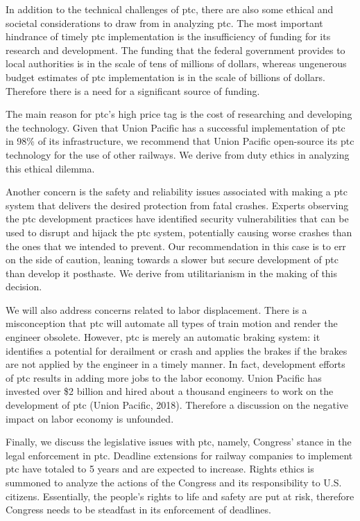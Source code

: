 \documentclass[11pt, titlepage]{article}
\begin{document}
In addition to the technical challenges of \gls{ptc}, there are also some
ethical and societal considerations to draw from in analyzing \gls{ptc}. The
most important hindrance of timely \gls{ptc} implementation is the
insufficiency of funding for its research and development. The funding that
the federal government provides to local authorities is in the scale of tens
of millions of dollars, whereas ungenerous budget estimates of \gls{ptc}
implementation is in the scale of billions of dollars. Therefore there is a
need for a significant source of funding.

The main reason for \gls{ptc}’s high price tag is the cost of researching and
developing the technology. Given that Union Pacific has a successful
implementation of \gls{ptc} in 98\% of its infrastructure, we recommend that
Union Pacific open-source its \gls{ptc} technology for the use of other
railways. We derive from duty ethics in analyzing this ethical dilemma.

Another concern is the safety and reliability issues associated with making a
\gls{ptc} system that delivers the desired protection from fatal crashes. Experts
observing the \gls{ptc} development practices have identified
security vulnerabilities that can be used to disrupt and hijack the \gls{ptc} system,
potentially causing worse crashes than the ones that we intended to prevent.
Our recommendation in this case is to err on the side of caution, leaning towards a
slower but secure development of \gls{ptc} than develop it
posthaste. We derive from utilitarianism in the making of this decision.

We will also address concerns related to labor displacement. There is a
misconception that \gls{ptc} will automate all types of train motion and
render the engineer obsolete. However, \gls{ptc} is merely an automatic
braking system: it identifies a potential for derailment or crash and applies
the brakes if the brakes are not applied by the engineer in a timely manner.
In fact, development efforts of \gls{ptc} results in adding more jobs to the
labor economy. Union Pacific has invested over \$2 billion and hired about a
thousand engineers to work on the development of \gls{ptc} (Union Pacific, 2018).
Therefore a discussion on the negative impact on labor economy is unfounded.

Finally, we discuss the legislative issues with \gls{ptc}, namely, Congress’
stance in the legal enforcement in \gls{ptc}. Deadline extensions for railway
companies to implement \gls{ptc} have totaled to 5 years and are expected to
increase. Rights ethics is summoned to analyze the actions of the Congress and
its responsibility to U.S. citizens. Essentially, the people’s rights to life
and safety are put at risk, therefore Congress needs to be steadfast in its
enforcement of deadlines.
\end{document}
